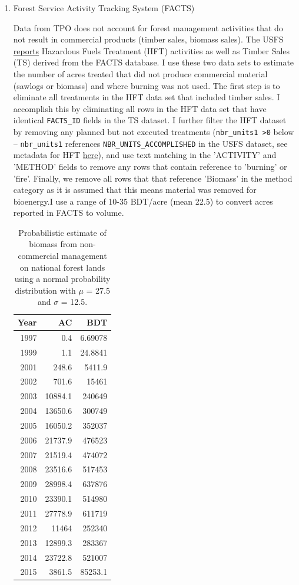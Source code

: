 \documentclass[a4paper,titlepage]{article}
\begin{document}
\begin{enumerate}
\item Forest Service Activity Tracking System (FACTS)
\label{sec:orgheadline18}

Data from TPO does not account for forest management activities that do
not result in commercial products (timber sales, biomass sales). The
USFS
\href{http://data.fs.usda.gov/geodata/edw/datasets.php?dsetParent=Activities}{reports}
Hazardous Fuels Treatment (HFT) activities as well as Timber Sales (TS)
derived from the FACTS database. I use these two data sets to estimate
the number of acres treated that did not produce commercial material
(sawlogs or biomass) and where burning was not used. The first step is
to eliminate all treatments in the HFT data set that included timber
sales. I accomplish this by eliminating all rows in the HFT data set
that have identical \texttt{FACTS\_ID} fields in the TS dataset. I further
filter the HFT dataset by removing any planned but not executed
treatments (\texttt{nbr\_units1 >0} below -- \texttt{nbr\_units1} references
\texttt{NBR\_UNITS\_ACCOMPLISHED} in the USFS dataset, see metadata for HFT
\href{http://data.fs.usda.gov/geodata/edw/edw_resources/meta/S_USA.Activity_HazFuelTrt_PL.xml}{here}),
and use text matching in the 'ACTIVITY' and 'METHOD' fields to remove
any rows that contain reference to 'burning' or 'fire'. Finally, we
remove all rows that that reference 'Biomass' in the method category as
it is assumed that this means material was removed for bioenergy.I use a
range of 10-35 BDT/acre (mean 22.5) to convert acres reported in FACTS to volume.
\begin{table}[htb]
\centering
\begin{tabular}{rrr}
Year & AC & BDT\\
\hline
1997 & 0.4 & 6.69078\\
1999 & 1.1 & 24.8841\\
2001 & 248.6 & 5411.9\\
2002 & 701.6 & 15461\\
2003 & 10884.1 & 240649\\
2004 & 13650.6 & 300749\\
2005 & 16050.2 & 352037\\
2006 & 21737.9 & 476523\\
2007 & 21519.4 & 474072\\
2008 & 23516.6 & 517453\\
2009 & 28998.4 & 637876\\
2010 & 23390.1 & 514980\\
2011 & 27778.9 & 611719\\
2012 & 11464 & 252340\\
2013 & 12899.3 & 283367\\
2014 & 23722.8 & 521007\\
2015 & 3861.5 & 85253.1\\
\end{tabular}
\caption{Probabilistic estimate of biomass from non-commercial management on national forest lands using a normal probability distribution with \(\mu\) = 27.5 and \(\sigma\) = 12.5.}

\end{table}
\end{enumerate}
\end{document}
